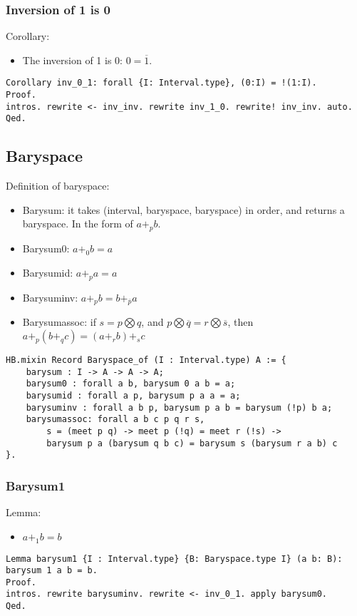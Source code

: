 \documentclass[a4paper,10pt]{article} %
\begin{document}
\subsubsection{Inversion of 1 is 0}
Corollary: 
\begin{itemize}
    \item The inversion of 1 is 0: \(0 = \overline{1}\).
\end{itemize}
\begin{lstlisting}
Corollary inv_0_1: forall {I: Interval.type}, (0:I) = !(1:I).
Proof.
intros. rewrite <- inv_inv. rewrite inv_1_0. rewrite! inv_inv. auto.
Qed.
\end{lstlisting}

\subsection{Baryspace}
Definition of baryspace:
\begin{itemize}
    \item Barysum: it takes (interval, baryspace, baryspace) in order, and returns a baryspace. In the form of \(a +_p b\).
    \item Barysum0: \(a +_0 b = a\)
    \item Barysumid: \(a +_p a = a\)
    \item Barysuminv: \(a +_p b = b +_{\overline{p}} a\)
    \item Barysumassoc: if \(s = p \bigotimes q\), and \(p \bigotimes \overline{q} = r \bigotimes \overline{s}\), then \(a +_p(b +_q c) = (a +_r b) +_s c\)
\end{itemize}
\begin{lstlisting}
HB.mixin Record Baryspace_of (I : Interval.type) A := {
    barysum : I -> A -> A -> A;
    barysum0 : forall a b, barysum 0 a b = a;
    barysumid : forall a p, barysum p a a = a;
    barysuminv : forall a b p, barysum p a b = barysum (!p) b a;
    barysumassoc: forall a b c p q r s, 
        s = (meet p q) -> meet p (!q) = meet r (!s) ->  
        barysum p a (barysum q b c) = barysum s (barysum r a b) c
}.
\end{lstlisting}

\subsubsection{Barysum1}
Lemma:
\begin{itemize}
    \item $a + _1b = b$
\end{itemize}
\begin{lstlisting}
Lemma barysum1 {I : Interval.type} {B: Baryspace.type I} (a b: B): barysum 1 a b = b.
Proof.
intros. rewrite barysuminv. rewrite <- inv_0_1. apply barysum0. 
Qed.
\end{lstlisting}
\end{document}
